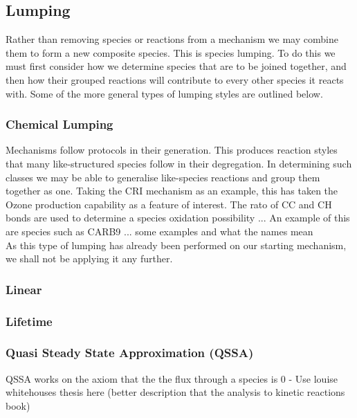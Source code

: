 \subsection{Lumping}



Rather than removing species or reactions from a mechanism we may combine them to form a new composite species. This is species lumping. To do this we must first consider how we determine species that are to be joined together, and then how their grouped reactions will contribute to every other species it reacts with. Some of the more general types of lumping styles are outlined below. 


\subsubsection{Chemical Lumping}
Mechanisms follow protocols in their generation. This produces reaction styles that many like-structured species follow in their degregation. In determining such classes we may be able to generalise like-species reactions and group them together as one. Taking the CRI mechanism as an example, this has taken the Ozone production capability as a feature of interest. The rato of CC and CH bonds are used to determine a species oxidation possibility ... An example of this are species such as CARB9  ... some examples and what the names mean \\

As this type of lumping has already been performed on our starting mechanism, we shall not be applying it any further. 


\subsubsection{Linear}
\subsubsection{Lifetime}
\subsubsection{Quasi Steady State Approximation (QSSA)}
QSSA works on the axiom that the the flux through a species is 0  - Use louise whitehouses thesis here (better description that the analysis to kinetic reactions book)
